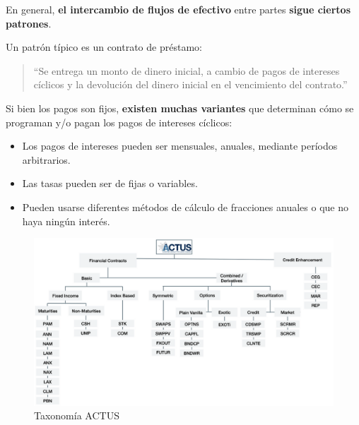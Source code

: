 \documentclass{beamer}
\begin{document}
\begin{frame}
    En general, \textbf{el intercambio de flujos de efectivo} entre partes \textbf{sigue ciertos patrones}. \pause
    \vfill

    Un patrón típico es un contrato de préstamo: \pause

    \vfill

    \begin{quote}
        ``Se entrega un monto de dinero inicial, a cambio de pagos de intereses cíclicos y la devolución del dinero inicial en el vencimiento del contrato.''
    \end{quote}
    \pause
    \vfill

    Si bien los pagos son fijos, \textbf{existen muchas variantes} que determinan cómo se programan y/o pagan los pagos de intereses cíclicos:
    \begin{itemize}
        \pause
        \item Los pagos de intereses pueden ser mensuales, anuales, mediante períodos arbitrarios. 
        \pause
        \item Las tasas pueden ser de fijas o variables.
        \pause
        \item Pueden usarse diferentes métodos de cálculo de fracciones anuales o que no haya ningún interés.
    \end{itemize}

\end{frame}

\begin{frame}[fragile]
\begin{figure}[H]
    \centering
    \includegraphics[width=\textwidth]{ACTUS_Taxonomy.png}
    \caption{Taxonomía ACTUS}
\end{figure}

\end{frame}
\end{document}
